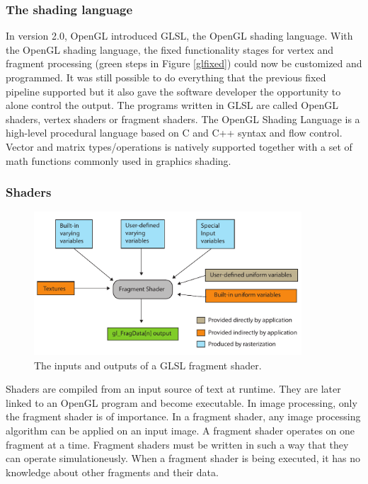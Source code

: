 \subsubsection{The shading language}

In version 2.0, OpenGL introduced GLSL, the OpenGL shading language. With the OpenGL shading language, the fixed functionality stages for vertex and fragment processing (green steps in Figure \ref{glfixed}) could now be customized and programmed. It was still possible to do everything that the previous fixed pipeline supported but it also gave the software developer the opportunity to alone control the output. The programs written in GLSL are called OpenGL shaders, vertex shaders or fragment shaders. The OpenGL Shading Language is a high-level procedural language based on C and C++ syntax and flow control. Vector and matrix types/operations is natively supported together with a set of  math functions commonly used in graphics shading.
\newline

\subsubsection{Shaders}

\begin{figure}[ht!]
\centering
\includegraphics[width=100mm]{img/frag.pdf}
\caption{The inputs and outputs of a GLSL fragment shader.}
\label{glfrag}
\end{figure}

Shaders are compiled from an input source of text at runtime. They are later linked to an OpenGL program and become executable. In image processing, only the fragment shader is of importance. In a fragment shader, any image processing algorithm can be applied on an input image. A fragment shader operates on one fragment at a time. Fragment shaders must be written in such a way that they can operate simulationeusly. When a fragment shader is being executed, it has no knowledge about other fragments and their data. 
\newline

